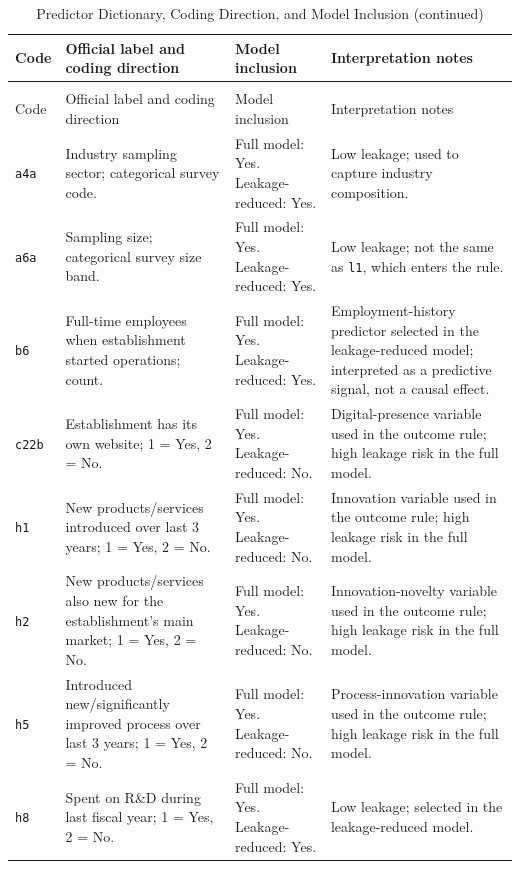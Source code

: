 \begin{longtable}{>{\RaggedRight\arraybackslash}p{1.3cm}>{\RaggedRight\arraybackslash}p{5.3cm}>{\RaggedRight\arraybackslash}p{3.0cm}>{\RaggedRight\arraybackslash}p{4.8cm}}
\caption{Predictor Dictionary, Coding Direction, and Model Inclusion}
\label{tab:predictor_dictionary}\\
\toprule
Code & Official label and coding direction & Model inclusion & Interpretation notes \\
\midrule
\endfirsthead
\caption[]{Predictor Dictionary, Coding Direction, and Model Inclusion (continued)}\\
\toprule
Code & Official label and coding direction & Model inclusion & Interpretation notes \\
\midrule
\endhead
\texttt{a4a} & Industry sampling sector; categorical survey code. & Full model: Yes. Leakage-reduced: Yes. & Low leakage; used to capture industry composition. \\
\texttt{a6a} & Sampling size; categorical survey size band. & Full model: Yes. Leakage-reduced: Yes. & Low leakage; not the same as \texttt{l1}, which enters the rule. \\
\texttt{b6} & Full-time employees when establishment started operations; count. & Full model: Yes. Leakage-reduced: Yes. & Employment-history predictor selected in the leakage-reduced model; interpreted as a predictive signal, not a causal effect. \\
\texttt{c22b} & Establishment has its own website; 1 = Yes, 2 = No. & Full model: Yes. Leakage-reduced: No. & Digital-presence variable used in the outcome rule; high leakage risk in the full model. \\
\texttt{h1} & New products/services introduced over last 3 years; 1 = Yes, 2 = No. & Full model: Yes. Leakage-reduced: No. & Innovation variable used in the outcome rule; high leakage risk in the full model. \\
\texttt{h2} & New products/services also new for the establishment's main market; 1 = Yes, 2 = No. & Full model: Yes. Leakage-reduced: No. & Innovation-novelty variable used in the outcome rule; high leakage risk in the full model. \\
\texttt{h5} & Introduced new/significantly improved process over last 3 years; 1 = Yes, 2 = No. & Full model: Yes. Leakage-reduced: No. & Process-innovation variable used in the outcome rule; high leakage risk in the full model. \\
\texttt{h8} & Spent on R\&D during last fiscal year; 1 = Yes, 2 = No. & Full model: Yes. Leakage-reduced: Yes. & Low leakage; selected in the leakage-reduced model. \\

\end{longtable}
